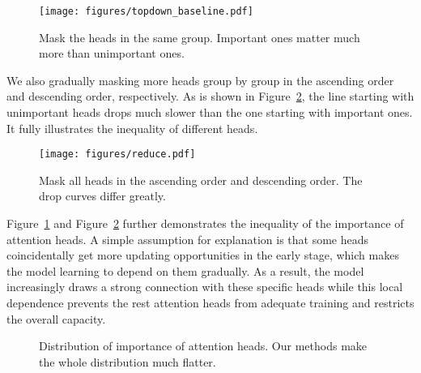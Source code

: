 \documentclass[11pt]{article}
\begin{document}
\begin{figure}[h]
    \centering
    \texttt{[image: figures/topdown\_baseline.pdf]}
    \caption{Mask the heads in the same group. Important ones matter much more than unimportant ones.}
\label{fig_maskhead}
\end{figure}

We also gradually masking more heads group by group in the ascending order and descending order, respectively. As is shown in Figure~\ref{fig_reduce}, the line starting with unimportant heads drops much slower than the one starting with important ones. It fully illustrates the inequality of different heads.

\begin{figure}[h]
    \centering
    \texttt{[image: figures/reduce.pdf]}
    \caption{Mask all heads in the ascending order and descending order. The drop curves differ greatly.} 
    \label{fig_reduce}
\end{figure}

Figure~\ref{fig_maskhead} and Figure~\ref{fig_reduce} further demonstrates the inequality of the importance of attention heads. 
A simple assumption for explanation is that some heads coincidentally get more updating opportunities in the early stage, which makes the model learning to depend on them gradually. 
As a result, the model increasingly draws a strong connection with these specific heads while this local dependence prevents the rest attention heads from adequate training and restricts the overall capacity. 



\begin{figure*}[b!]\footnotesize
    \centering
    \caption{Distribution of importance of attention heads. Our methods make the whole distribution much flatter.}
    \label{fig_maskhead_dis}
\end{figure*}
\end{document}
